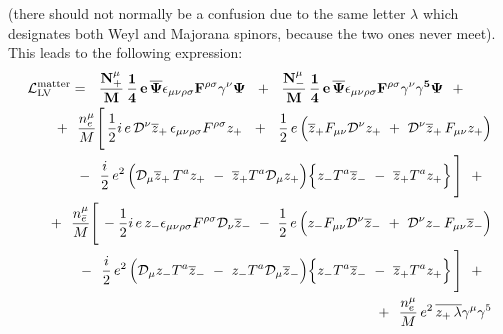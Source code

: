 \documentclass[12pt]{revtex4}
\newcommand{\slashed}[1]{\hbox{{$#1$}\llap{$/$}}}
\begin{document}
(there should not normally be a confusion due to the
same letter $ \lambda $ which designates both Weyl
and Majorana spinors, because the two ones never meet).
This leads to the following expression:
\begin{eqnarray}
\nonumber
\lefteqn{
     \mathcal{L}_{\mathrm{LV}}^{\mathrm{matter}}  = 
~~      %
\mathbf{
\frac{N_+^\mu}{M}\,
\frac{1}{4} \,e\,
\overline{\Psi} \epsilon_{\mu\nu\rho\sigma}
F^{\rho\sigma} \gamma^\nu \Psi 
     }
~~+~~
\mathbf{
\frac{N_-^\mu}{M}\,
\frac{1}{4} \,e\,
\overline{\Psi} \epsilon_{\mu\nu\rho\sigma}
F^{\rho\sigma} \gamma^\nu \gamma^5 \Psi 
     }
~~+~~ 
}\\
\nonumber
&&
~~+~~
\frac{n_e^\mu}{M}
\Bigg[\,
\frac{1}{2}i \,e \, 
\mathcal{D}^\nu \overline{z}_+ \,
\epsilon_{\mu\nu\rho\sigma}F^{\rho\sigma} z_+ 
~~+~~
\frac{1}{2}\, e\,
\Big(
  \overline{z}_+ F_{\mu\nu}
  \mathcal{D}^\nu z_+ 
  ~+~
  \mathcal{D}^\nu \overline{z}_+ \,
  F_{\mu\nu} z_+
\Big) 
\\
\nonumber
&&
               \qquad
~~-~~
\frac{i}{2}\, e^2\,
\Big(
  \mathcal{D}_\mu \overline{z}_+ \,
  T^a z_+ 
  ~-~
  \overline{z}_+ T^a \mathcal{D}_\mu z_+
\Big)
\Big\{
  z_- T^a \overline{z}_- 
  ~-~
  \overline{z}_+ T^a z_+
\Big\}
\,\Bigg] ~~+~~ \\
\nonumber
&&
~~+~~
\frac{n_{\bar{e}}^\mu}{M}
\Bigg[\,
- \frac{1}{2} i\, e\,
z_- \epsilon_{\mu\nu\rho\sigma}F^{\rho\sigma}
\mathcal{D}_\nu \overline{z}_- 
~-~
\frac{1}{2}\, e\,
\Big(
  z_- F_{\mu\nu}\mathcal{D}^\nu \overline{z}_- 
  ~+~
  \mathcal{D}^\nu z_- \,
  F_{\mu\nu} \overline{z}_- 
\Big)
\\
\nonumber
&&
               \qquad
~~-~~ 
\frac{i}{2}\, e^2\,
\Big(
  \mathcal{D}_\mu z_- T^a \overline{z}_-
  ~-~
  z_- T^a \mathcal{D}_\mu \overline{z}_-
\Big)
\Big\{
  z_- T^a \overline{z}_- 
  ~-~
  \overline{z}_+ T^a z_+
\Big\}
\,\Bigg]
~~+~~ \\
\nonumber
&&
~~+~~
\frac{n_e^\mu}{M}\, e^2\,
\overline{z_+ \, \lambda} \gamma^\mu \gamma^5 

\end{eqnarray}
\end{document}
